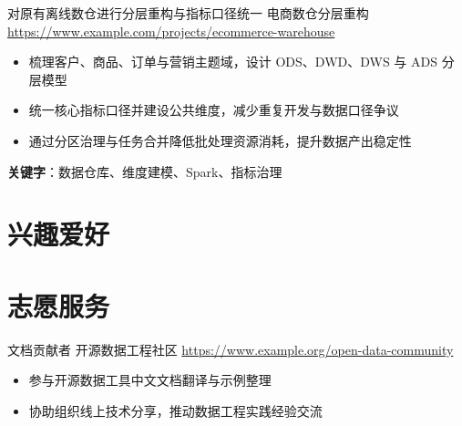 \documentclass[a4paper, serif, 10pt]{moderncv}
\begin{document}
        {对原有离线数仓进行分层重构与指标口径统一}
        {电商数仓分层重构}
        {\url{https://www.example.com/projects/ecommerce-warehouse}}
        {}
        {\begin{itemize}
\item 梳理客户、商品、订单与营销主题域，设计 ODS、DWD、DWS 与 ADS 分层模型
\item 统一核心指标口径并建设公共维度，减少重复开发与数据口径争议
\item 通过分区治理与任务合并降低批处理资源消耗，提升数据产出稳定性
\end{itemize}
\textbf{关键字}：数据仓库、维度建模、Spark、指标治理}
\section{兴趣爱好}

\section{志愿服务}

        {文档贡献者}
        {开源数据工程社区}
        {\url{https://www.example.org/open-data-community}}
        {}
        {\begin{itemize}
\item 参与开源数据工具中文文档翻译与示例整理
\item 协助组织线上技术分享，推动数据工程实践经验交流
\end{itemize}}
    
\end{document}
